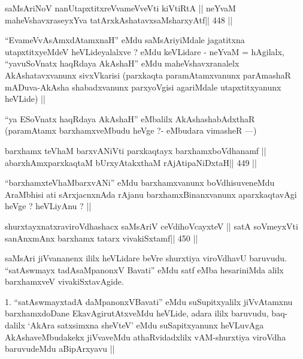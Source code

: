 \begin{shl}
saMsAriNoV nanUtapxtitxreVvameVveVti kiVtiRtA ||
neYvaM maheVshavxraseyxYva tatArx\s\s kAshatavxsaMsharxyAtf\hfill || 448 ||
\end{shl}

\begin{artha}
``EvameVvAsAmxdAtamxnaH'' eMdu saMsAriyiMdale jagatitxna
  utapxtitxyeMdeV heVLideyalalxve ? eMdu keVLidare - neYvaM =
  hAgilalx, ``yavuSoV\s natx haqRdaya AkAshaH'' eMdu
  maheVshavxranalelx AkAshatavxvanunx sivxVkarisi (parxkaqta
  paramAtamxvanunx parAmashaR mADuva-AkAsha shabadxvanunx parxyoVgisi
  agariMdale utapxtitxyanunx heVLide) ||
\end{artha}

\begin{artha}
``ya ESoV\s natx haqRdaya AkAshaH'' eMbalilx AkAshashabAdxthaR
  (paramAtamx barxhamxveMbudu heVge ?- eMbudara vimasheR ---)
\end{artha}

\begin{shl}
barxhamx teV\s haM barxvANiVti parxkaqtayx barxhamxboVdhanamf ||
abarxhAmxparxkaqtaM bUrxyAtakxthaM rAjA\s tipaNiDxtaH\hfill || 449 ||
\end{shl}

\begin{artha}
``barxhamxteV\s haMbarxvANi'' eMdu barxhamxvanunx boVdhisuveneMdu
  AraMbhisi ati sArxjacnxnAda rAjanu barxhamxBinanxvanunx
  aparxkaqtavAgi heVge ? heVLiyAnu ? ||
\end{artha}

\begin{shl}
shurxtayxnatxraviroVdhashacx saMsAriV ceVdihoVcayxteV ||
satA soVmeyxVti sanAnxmAnx barxhamx tatarx vivakiSxtamf\hfill || 450 ||
\end{shl}

\begin{artha}
saMsAri jiVvananenx ililx heVLidare beVre shurxtiya viroVdhavU
baruvudu. ``satAswmayx tadAsaMpanonxV Bavati'' eMdu satf eMba
hesariniMda alilx barxhamxveV vivakiSxtavAgide.
\end{artha}

\begin{artha}
1. ``satAswmayxtadA daMpanonxVBavati'' eMdu suSupitxyalilx jiVvAtamxnu
barxhamxdoDane EkavAgirutAtxveMdu heVLide, adara ililx baruvudu,
baq-dalilx `AkAra satxsimxna sheVteV' eMdu suSapitxyanunx heVLuvAga
AkAshaveMbudakekx jiVvaveMdu athaRvidadxlilx vAM-shurxtiya viroVdha
baruvudeMdu aBipArxyavu ||
\end{artha}

